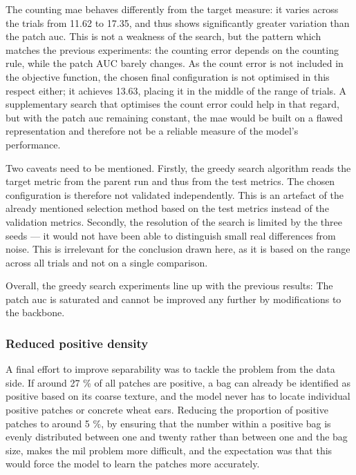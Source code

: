 \documentclass[12pt,parskip = half, DIV=classic,listof=totoc]{scrartcl}
\begin{document}
			The counting \ac{mae} behaves differently from the target measure: it varies across the
			trials from 11.62 to 17.35, and thus shows significantly greater variation than the patch \ac{auc}. This
			is not a weakness of the search, but the pattern which matches the previous experiments: 
			the counting error depends on the counting rule, while the patch AUC barely changes. As the count error is not
			included in the objective function, the chosen final configuration is not
			optimised in this respect either; it achieves 13.63, placing it in the middle of the
			range of trials. A supplementary search that optimises the count error could help in that regard, but
			with the patch \ac{auc} remaining constant, the \ac{mae} would be built on a flawed representation and therefore not be a reliable measure of the model's performance.

			Two caveats need to be mentioned. Firstly, the greedy search algorithm reads the
			target metric from the parent run and thus from the test metrics. The chosen
			configuration is therefore not validated independently. This is an artefact of the already mentioned selection method based on the 
			test metrics instead of the validation metrics. Secondly, the resolution of the
			search is limited by the three seeds — it would not have been able to distinguish
			small real differences from noise. This is irrelevant for the conclusion drawn here,
			as it is based on the range across all trials and not on a single comparison.

			Overall, the greedy search experiments line up with the previous results: The patch \ac{auc} is saturated and cannot be improved any 
			further by modifications to the backbone.

			\subsubsection{Reduced positive density}
			A final effort to improve separability was to tackle the problem from the data side. 
			If around 27 \% of all patches are positive, a bag can already be identified as positive based on
			its coarse texture, and the model never has to locate individual positive patches or concrete wheat ears. 
			Reducing the proportion of positive patches to around 5 \%,
			by ensuring that the number within a positive bag is evenly distributed between one and twenty
			rather than between one and the bag size, makes the \ac{mil} problem more difficult,
			and the expectation was that this would force the model to learn the patches more
			accurately.
\end{document}
